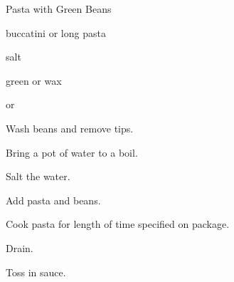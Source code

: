 \begin{recipe}{Pasta with Green Beans}{}{}

\begin{ingredients}
\item buccatini or long pasta
\item salt
\item green or wax 
\item {} or 
\end{ingredients}

\begin{directions}
\item Wash beans and remove tips.
\item Bring a pot of water to a boil.
\item Salt the water.
\item Add pasta and beans.
\item Cook pasta for length of time specified on package.
\item Drain.
\item Toss in sauce.
\end{directions}

\end{recipe}
